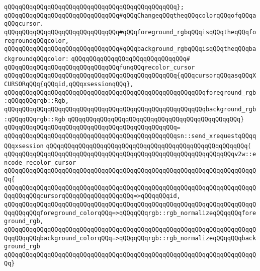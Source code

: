 \verb|qQQqqQQqqQQqqQQqqQQqqQQqqQQqqQQqqQQqqQQqqQQqqQQq};|\newline
\newline
\verb|qQQqqQQqqQQqqQQqqQQqqQQqqQQqqQQq#qQQqChangeqQQqtheqQQqcolorqQQqofqQQqaqQQqcursor.|\newline
\verb|qQQqqQQqqQQqqQQqqQQqqQQqqQQqqQQq#qQQqforeground_rgbqQQqisqQQqtheqQQqforegroundqQQqcolor,|\newline
\verb|qQQqqQQqqQQqqQQqqQQqqQQqqQQqqQQq#qQQqbackground_rgbqQQqisqQQqtheqQQqbackgroundqQQqcolor:|\newline
\verb|qQQqqQQqqQQqqQQqqQQqqQQqqQQqqQQq#|\newline
\verb|qQQqqQQqqQQqqQQqqQQqqQQqqQQqqQQqfunqQQqrecolor_cursor|\newline
\verb|qQQqqQQqqQQqqQQqqQQqqQQqqQQqqQQqqQQqqQQqqQQqqQQq{qQQqcursorqQQqasqQQqXCURSORqQQq{qQQqid,qQQqxsessionqQQq},|\newline
\verb|qQQqqQQqqQQqqQQqqQQqqQQqqQQqqQQqqQQqqQQqqQQqqQQqqQQqqQQqforeground_rgb:qQQqqQQqrgb::Rgb,|\newline
\verb|qQQqqQQqqQQqqQQqqQQqqQQqqQQqqQQqqQQqqQQqqQQqqQQqqQQqqQQqbackground_rgb:qQQqqQQqrgb::Rgb|\newline
\verb|qQQqqQQqqQQqqQQqqQQqqQQqqQQqqQQqqQQqqQQqqQQqqQQq}|\newline
\verb|qQQqqQQqqQQqqQQqqQQqqQQqqQQqqQQqqQQqqQQqqQQqqQQq=|\newline
\verb|qQQqqQQqqQQqqQQqqQQqqQQqqQQqqQQqqQQqqQQqqQQqqQQqsn::send_xrequestqQQqqQQqxsession|\newline
\verb|qQQqqQQqqQQqqQQqqQQqqQQqqQQqqQQqqQQqqQQqqQQqqQQqqQQqqQQq(|\newline
\verb|qQQqqQQqqQQqqQQqqQQqqQQqqQQqqQQqqQQqqQQqqQQqqQQqqQQqqQQqqQQqqQQqv2w::encode_recolor_cursor|\newline
\verb|qQQqqQQqqQQqqQQqqQQqqQQqqQQqqQQqqQQqqQQqqQQqqQQqqQQqqQQqqQQqqQQqqQQqqQQq{|\newline
\verb|qQQqqQQqqQQqqQQqqQQqqQQqqQQqqQQqqQQqqQQqqQQqqQQqqQQqqQQqqQQqqQQqqQQqqQQqqQQqqQQqcursorqQQqqQQqqQQqqQQqqQQq=>qQQqqQQqid,|\newline
\verb|qQQqqQQqqQQqqQQqqQQqqQQqqQQqqQQqqQQqqQQqqQQqqQQqqQQqqQQqqQQqqQQqqQQqqQQqqQQqqQQqforeground_colorqQQq=>qQQqqQQqrgb::rgb_normalizeqQQqqQQqforeground_rgb,|\newline
\verb|qQQqqQQqqQQqqQQqqQQqqQQqqQQqqQQqqQQqqQQqqQQqqQQqqQQqqQQqqQQqqQQqqQQqqQQqqQQqqQQqbackground_colorqQQq=>qQQqqQQqrgb::rgb_normalizeqQQqqQQqbackground_rgb|\newline
\verb|qQQqqQQqqQQqqQQqqQQqqQQqqQQqqQQqqQQqqQQqqQQqqQQqqQQqqQQqqQQqqQQqqQQqqQQq}|\newline
